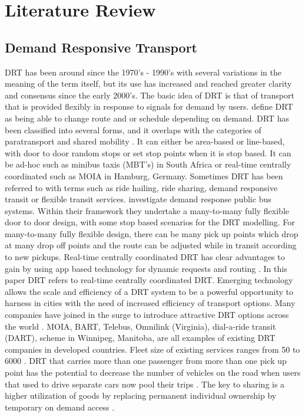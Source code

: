 \documentclass[a4paper]{article}
\begin{document}
\section*{Literature Review}
\subsection*{Demand Responsive Transport}

DRT has been around since the 1970's - 1990's with several variations in the meaning of the term itself, but its use has increased and reached greater clarity and consensus since the early 2000's.
The basic idea of DRT is that of transport that is provided flexibly in response to signals for demand by users. \citealp{butler2020smart} define DRT as being able to change route and or schedule depending on demand. DRT has been classified into several forms, and it overlaps with the categories of paratransport and shared mobility  \citep{butler2020smart}.
It can either be area-based or line-based, with door to door random stops or set stop points when it is stop based. It can be ad-hoc such as minibus taxis (MBT's) in South Africa or real-time centrally coordinated such as MOIA in Hamburg, Germany. Sometimes DRT has been referred to with terms such as ride hailing, ride sharing, demand responsive transit or flexible transit services. \citealp{vansteenwegen2022survey} investigate demand response public bus systems. Within their framework they undertake  a many-to-many fully flexible door to door design, with some stop based scenarios for the  DRT modelling. For many-to-many fully flexible design, there can be many pick up points which drop at many drop off points and the route can be adjusted while in transit according to new pickups.
Real-time centrally coordinated DRT has clear advantages to gain by using app based technology for dynamic requests and routing \citep{zwick2021ride}. In this paper DRT refers to real-time centrally coordinated DRT. Emerging technology allows the scale and efficiency of a DRT system to be a powerful opportunity to harness in cities with the need of increased efficiency of transport options. Many companies have joined in the surge to introduce attractive DRT options across the world \citep{zwick2021ride}.  MOIA, BART, Telebus, Omnilink (Virginia), dial-a-ride transit (DART), scheme in Winnipeg, Manitoba, are all examples of existing DRT companies in developed countries. Fleet size of existing services ranges from 50 to 6000 \citep{zwick2021ride}.
DRT that carries more than one passenger from more than one pick up point has the potential to decrease the number of vehicles on the road when users that used to drive separate cars now pool their trips \citep{zwick2021ride}. The key to sharing is a higher utilization of goods by replacing permanent individual ownership by temporary on demand access \citep{botsman2010s}.
\end{document}
